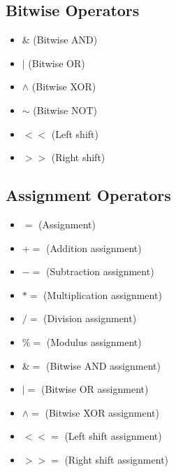 \documentclass{report}
\begin{document}
    \begin{minipage}[t]{0.47\textwidth}
        \subsection{Bitwise Operators}
        \begin{itemize}
          \item \( \& \) (Bitwise AND)
          \item \( | \) (Bitwise OR)
          \item \( \wedge\) (Bitwise XOR)
          \item \( \sim \) (Bitwise NOT)
          \item \( << \) (Left shift)
          \item \( >> \) (Right shift)
        \end{itemize}
    \end{minipage}
    \bigbreak \noindent 
    \begin{minipage}[t]{0.47\textwidth}
     \subsection{Assignment Operators}
    \begin{itemize}
      \item \( = \) (Assignment)
      \item \( += \) (Addition assignment)
      \item \( -= \) (Subtraction assignment)
      \item \( *= \) (Multiplication assignment)
      \item \( /= \) (Division assignment)
      \item \( \%= \) (Modulus assignment)
      \item \( \&= \) (Bitwise AND assignment)
      \item \( |= \) (Bitwise OR assignment)
      \item \( \wedge= \) (Bitwise XOR assignment)
      \item \( <<= \) (Left shift assignment)
      \item \( >>= \) (Right shift assignment)
    \end{itemize}
    \end{minipage}
\end{document}

